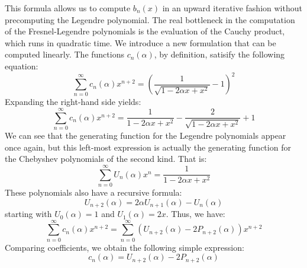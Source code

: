 \documentclass{article}
\theoremstyle{plain}
\begin{document}
        This formula allows us to compute $b_{n}(x)$ in an upward iterative
        fashion without precomputing the Legendre polynomial. The real
        bottleneck in the computation of the Fresnel-Legendre polynomials is
        the evaluation of the Cauchy product, which runs in quadratic time.
        We introduce a new formulation that can be computed linearly. The
        functions $c_{n}(\alpha)$, by definition, satisify the following
        equation:
        \begin{equation}
            \sum_{n=0}^{\infty}c_{n}(\alpha)x^{n+2}
            =\left(
                \frac{1}{\sqrt{1-2\alpha{x}+x^{2}}}-1
            \right)^{2}
        \end{equation}
        Expanding the right-hand side yields:
        \begin{equation}
            \sum_{n=0}^{\infty}c_{n}(\alpha)x^{n+2}
            =\frac{1}{1-2\alpha{x}+x^{2}}
            -\frac{2}{\sqrt{1-2\alpha{x}+x^{2}}}
            +1
        \end{equation}
        We can see that the generating function for the Legendre polynomials
        appear once again, but this left-most expression is actually the
        generating function for the Chebyshev polynomials of the second kind.
        That is:
        \begin{equation}
            \sum_{n=0}^{\infty}U_{n}(\alpha)x^{n}
            =\frac{1}{1-2\alpha{x}+x^{2}}
        \end{equation}
        These polynomials also have a recursive formula:
        \begin{equation}
            U_{n+2}(\alpha)=2\alpha{U}_{n+1}(\alpha)-U_{n}(\alpha)
        \end{equation}
        starting with $U_{0}(\alpha)=1$ and $U_{1}(\alpha)=2x$. Thus, we have:
        \begin{equation}
            \sum_{n=0}^{\infty}c_{n}(\alpha)x^{n+2}
            =\sum_{n=0}^{\infty}\left(
                U_{n+2}(\alpha)-2P_{n+2}(\alpha)
            \right)x^{n+2}
        \end{equation}
        Comparing coefficients, we obtain the following simple expression:
        \begin{equation}
            c_{n}(\alpha)=U_{n+2}(\alpha)-2P_{n+2}(\alpha)
        \end{equation}
\end{document}
